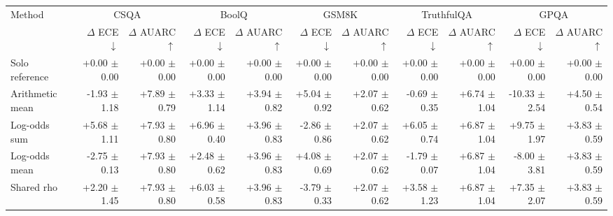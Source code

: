 \begin{tabular}{lrrrrrrrrrr}
\toprule
Method & \multicolumn{2}{c}{CSQA} & \multicolumn{2}{c}{BoolQ} & \multicolumn{2}{c}{GSM8K} & \multicolumn{2}{c}{TruthfulQA} & \multicolumn{2}{c}{GPQA} \\
 & $\Delta$ ECE $\downarrow$ & $\Delta$ AUARC $\uparrow$ & $\Delta$ ECE $\downarrow$ & $\Delta$ AUARC $\uparrow$ & $\Delta$ ECE $\downarrow$ & $\Delta$ AUARC $\uparrow$ & $\Delta$ ECE $\downarrow$ & $\Delta$ AUARC $\uparrow$ & $\Delta$ ECE $\downarrow$ & $\Delta$ AUARC $\uparrow$ \\
\midrule
Solo reference & +0.00 {\scriptsize $\pm$ 0.00} & +0.00 {\scriptsize $\pm$ 0.00} & +0.00 {\scriptsize $\pm$ 0.00} & +0.00 {\scriptsize $\pm$ 0.00} & +0.00 {\scriptsize $\pm$ 0.00} & +0.00 {\scriptsize $\pm$ 0.00} & +0.00 {\scriptsize $\pm$ 0.00} & +0.00 {\scriptsize $\pm$ 0.00} & +0.00 {\scriptsize $\pm$ 0.00} & +0.00 {\scriptsize $\pm$ 0.00} \\
Arithmetic mean & -1.93 {\scriptsize $\pm$ 1.18} & +7.89 {\scriptsize $\pm$ 0.79} & +3.33 {\scriptsize $\pm$ 1.14} & +3.94 {\scriptsize $\pm$ 0.82} & +5.04 {\scriptsize $\pm$ 0.92} & +2.07 {\scriptsize $\pm$ 0.62} & -0.69 {\scriptsize $\pm$ 0.35} & +6.74 {\scriptsize $\pm$ 1.04} & -10.33 {\scriptsize $\pm$ 2.54} & +4.50 {\scriptsize $\pm$ 0.54} \\
Log-odds sum & +5.68 {\scriptsize $\pm$ 1.11} & +7.93 {\scriptsize $\pm$ 0.80} & +6.96 {\scriptsize $\pm$ 0.40} & +3.96 {\scriptsize $\pm$ 0.83} & -2.86 {\scriptsize $\pm$ 0.86} & +2.07 {\scriptsize $\pm$ 0.62} & +6.05 {\scriptsize $\pm$ 0.74} & +6.87 {\scriptsize $\pm$ 1.04} & +9.75 {\scriptsize $\pm$ 1.97} & +3.83 {\scriptsize $\pm$ 0.59} \\
Log-odds mean & -2.75 {\scriptsize $\pm$ 0.13} & +7.93 {\scriptsize $\pm$ 0.80} & +2.48 {\scriptsize $\pm$ 0.62} & +3.96 {\scriptsize $\pm$ 0.83} & +4.08 {\scriptsize $\pm$ 0.69} & +2.07 {\scriptsize $\pm$ 0.62} & -1.79 {\scriptsize $\pm$ 0.07} & +6.87 {\scriptsize $\pm$ 1.04} & -8.00 {\scriptsize $\pm$ 3.81} & +3.83 {\scriptsize $\pm$ 0.59} \\
Shared rho & +2.20 {\scriptsize $\pm$ 1.45} & +7.93 {\scriptsize $\pm$ 0.80} & +6.03 {\scriptsize $\pm$ 0.58} & +3.96 {\scriptsize $\pm$ 0.83} & -3.79 {\scriptsize $\pm$ 0.33} & +2.07 {\scriptsize $\pm$ 0.62} & +3.58 {\scriptsize $\pm$ 1.23} & +6.87 {\scriptsize $\pm$ 1.04} & +7.35 {\scriptsize $\pm$ 2.07} & +3.83 {\scriptsize $\pm$ 0.59} \\

\end{tabular}
